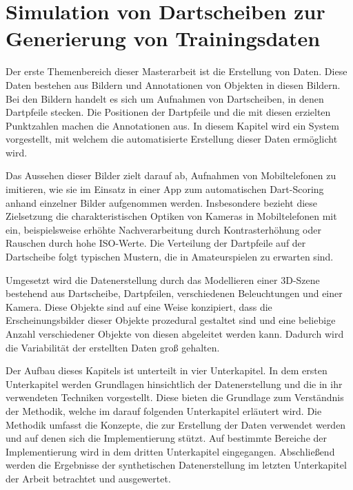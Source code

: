 
\chapter{Simulation von Dartscheiben zur Generierung von Trainingsdaten}
\label{cha:daten}

Der erste Themenbereich dieser Masterarbeit ist die Erstellung von Daten. Diese Daten bestehen aus Bildern und Annotationen von Objekten in diesen Bildern. Bei den Bildern handelt es sich um Aufnahmen von Dartscheiben, in denen Dartpfeile stecken. Die Positionen der Dartpfeile und die mit diesen erzielten Punktzahlen machen die Annotationen aus. In diesem Kapitel wird ein System vorgestellt, mit welchem die automatisierte Erstellung dieser Daten ermöglicht wird.

Das Aussehen dieser Bilder zielt darauf ab, Aufnahmen von Mobiltelefonen zu imitieren, wie sie im Einsatz in einer App zum automatischen Dart-Scoring anhand einzelner Bilder aufgenommen werden. Insbesondere bezieht diese Zielsetzung die charakteristischen Optiken von Kameras in Mobiltelefonen mit ein, beispielsweise erhöhte Nachverarbeitung durch Kontrasterhöhung oder Rauschen durch hohe ISO-Werte. Die Verteilung der Dartpfeile auf der Dartscheibe folgt typischen Mustern, die in Amateurspielen zu erwarten sind.

Umgesetzt wird die Datenerstellung durch das Modellieren einer 3D-Szene bestehend aus Dartscheibe, Dartpfeilen, verschiedenen Beleuchtungen und einer Kamera. Diese Objekte sind auf eine Weise konzipiert, dass die Erscheinungsbilder dieser Objekte prozedural gestaltet sind und eine beliebige Anzahl verschiedener Objekte von diesen abgeleitet werden kann. Dadurch wird die Variabilität der erstellten Daten groß gehalten.

Der Aufbau dieses Kapitels ist unterteilt in vier Unterkapitel. In dem ersten Unterkapitel werden Grundlagen hinsichtlich der Datenerstellung und die in ihr verwendeten Techniken vorgestellt. Diese bieten die Grundlage zum Verständnis der Methodik, welche im darauf folgenden Unterkapitel erläutert wird. Die Methodik umfasst die Konzepte, die zur Erstellung der Daten verwendet werden und auf denen sich die Implementierung stützt. Auf bestimmte Bereiche der Implementierung wird in dem dritten Unterkapitel eingegangen. Abschließend werden die Ergebnisse der synthetischen Datenerstellung im letzten Unterkapitel der Arbeit betrachtet und ausgewertet.





